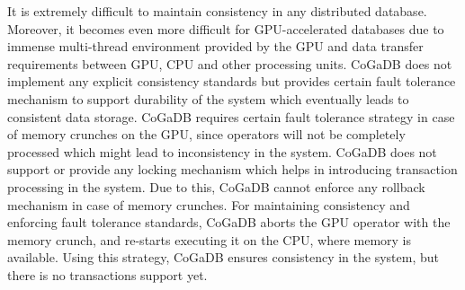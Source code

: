 It is extremely difficult to maintain consistency in any distributed database. Moreover, it becomes even more difficult for GPU-accelerated databases due to immense multi-thread environment provided by the GPU and data transfer requirements between GPU, CPU and other processing units. CoGaDB does not implement any explicit consistency standards but provides certain fault tolerance mechanism to support durability of the system which eventually leads to consistent data storage.
\newline
CoGaDB requires certain fault tolerance strategy in case of memory crunches on the GPU, since operators will not be completely processed which might lead to inconsistency in the system. CoGaDB does not support or provide any locking mechanism which helps in introducing transaction processing in the system. Due to this, CoGaDB cannot enforce any rollback mechanism in case of memory crunches. For maintaining consistency and enforcing fault tolerance standards, CoGaDB aborts the GPU operator with the memory crunch, and re-starts executing it on the CPU, where memory is available. Using this strategy, CoGaDB ensures consistency in the system, but there is no transactions support yet. 